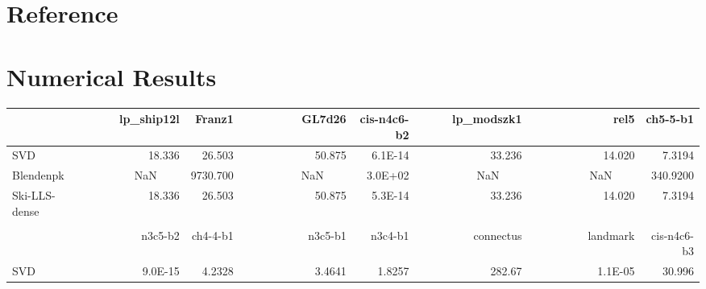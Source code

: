 \documentclass[english,11pt]{article}
\begin{document}
\section{Reference}


\clearpage
 


\appendix

\section{Numerical Results}
\begin{table}[H]
\scriptsize
\centering
\begin{tabular}{l|rrrrrrr}
               & lp\_ship12l                          & Franz1               & GL7d26                                & cis-n4c6-b2          & lp\_modszk1                           & rel5                                  & ch5-5-b1              \\ 
\hline
SVD          & 18.336                               & 26.503               & 50.875                                & 6.1E-14              & 33.236                                & 14.020                                & 7.3194                \\
Blendenpk      & \multicolumn{1}{l}{~~~~~~~~~NaN~~~~} & 9730.700             & \multicolumn{1}{l}{~~~~~~~~~~NaN~~~~} & 3.0E+02              & \multicolumn{1}{l}{~~~~~~~~~~NaN~~~~} & \multicolumn{1}{l}{~~~~~~~~~~NaN~~~~} & 340.9200              \\
Ski-LLS-dense  & 18.336                               & 26.503               & 50.875                                & 5.3E-14              & 33.236                                & 14.020                                & 7.3194                \\
               & \multicolumn{1}{l}{}                 & \multicolumn{1}{l}{} & \multicolumn{1}{l}{}                  & \multicolumn{1}{l}{} & \multicolumn{1}{l}{}                  & \multicolumn{1}{l}{}                  & \multicolumn{1}{l}{}  \\
               & n3c5-b2                              & ch4-4-b1             & n3c5-b1                               & n3c4-b1              & connectus                             & landmark                              & cis-n4c6-b3           \\ 
\hline
SVD            & 9.0E-15                              & 4.2328               & 3.4641                                & 1.8257               & 282.67                                & 1.1E-05                               & 30.996                \\

\end{tabular}
\end{table}
\end{document}
